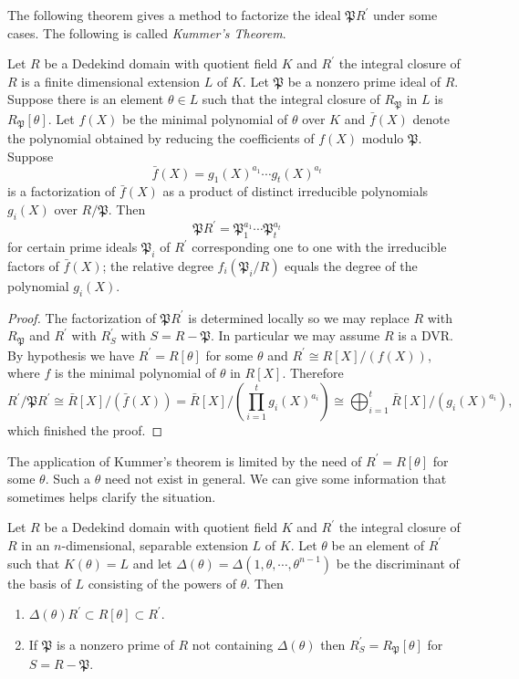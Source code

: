 The following theorem gives a method to factorize the ideal $\mathfrak{P}R^\prime$ under some cases. The following is called \textit{Kummer's Theorem}.
\begin{theorem}\label{Kummer}
Let $R$ be a Dedekind domain with quotient field $K$ and $R^\prime$ the integral closure of $R$ is a finite dimensional extension $L$ of $K$. Let $\mathfrak{P}$ be a nonzero prime ideal of $R$. Suppose there is an element $\theta\in L$ such that the integral closure of $R_\mathfrak{P}$ in $L$ is $R_\mathfrak{P}[\theta]$. Let $f(X)$ be the minimal polynomial of $\theta$ over $K$ and $\bar{f}(X)$ denote the polynomial obtained by reducing the coefficients of $f(X)$ modulo $\mathfrak{P}$. Suppose 
$$\bar{f}(X)=g_1(X)^{a_1}\cdots g_t(X)^{a_t}$$
is a factorization of $\bar{f}(X)$ as a product of distinct irreducible polynomials $g_i(X)$ over $R/\mathfrak{P}$. Then 
$$
\mathfrak{P}R^\prime=\mathfrak{P}_1^{a_1}\cdots\mathfrak{P}_t^{a_t}
$$
for certain prime ideals $\mathfrak{P}_i$ of $R^\prime$ corresponding one to one with the irreducible factors of $\bar{f}(X)$; the relative degree $f_i(\mathfrak{P}_i/R)$ equals the degree of the polynomial $g_i(X)$.
\end{theorem}
\begin{proof}
The factorization of $\mathfrak{P}R^\prime$ is determined locally so we may replace $R$ with $R_\mathfrak{P}$ and $R^\prime$ with $R_S^\prime$ with $S=R-\mathfrak{P}$. In particular we may assume $R$ is a DVR. By hypothesis we have $R^\prime=R[\theta]$ for some $\theta$ and $R^\prime\cong R[X]/(f(X))$, where $f$ is the minimal polynomial of $\theta$ in $R[X]$. Therefore 
$$
R^{\prime}/\mathfrak{P} R^{\prime}\cong \bar{R}\left[ X \right] /\left( \bar{f}\left( X \right) \right) =\bar{R}\left[ X \right] /\left( \prod_{i=1}^t{g_i\left( X \right) ^{a_i}} \right) \cong \bigoplus_{i=1}^t{\bar{R}\left[ X \right] /\left( g_i\left( X \right) ^{a_i} \right)},
$$
which finished the proof.
\end{proof}
The application of Kummer's theorem is limited by the need of $R^\prime=R[\theta]$ for some $\theta$. Such a $\theta$ need not exist in general. We can give some information that sometimes helps clarify the situation.
\begin{theorem}\label{DelaThetaChara}
Let $R$ be a Dedekind domain with quotient field $K$ and $R^\prime$ the integral closure of $R$ in an $n$-dimensional, separable extension $L$ of $K$. Let $\theta$ be an element of $R^\prime$ such that $K(\theta)=L$ and let $\Delta(\theta)=\Delta(1,\theta,\cdots,\theta^{n-1})$ be the discriminant of the basis of $L$ consisting of the powers of $\theta$. Then 
\begin{enumerate}
    \item $\Delta(\theta)R^\prime\subset R[\theta]\subset R^\prime$.
    \item If $\mathfrak{P}$ is a nonzero prime of $R$ not containing $\Delta(\theta)$ then $R_S^\prime=R_\mathfrak{P}[\theta]$ for $S=R-\mathfrak{P}$.
\end{enumerate}
\end{theorem}
